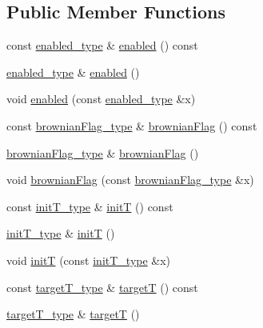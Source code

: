 \subsection*{Public Member Functions}
\begin{DoxyCompactItemize}
\item 
const \hyperlink{classthermo__t_adf9ac04cf37c2de46153e42511aa24c2}{enabled\-\_\-type} \& \hyperlink{classthermo__t_a3aa7ffbdb0417688a62e179a18ba7462}{enabled} () const 
\item 
\hyperlink{classthermo__t_adf9ac04cf37c2de46153e42511aa24c2}{enabled\-\_\-type} \& \hyperlink{classthermo__t_a0217614b0cde90034bd14ae06c4eec98}{enabled} ()
\item 
void \hyperlink{classthermo__t_a8a9c1776001e41905c35ae9350c1b90f}{enabled} (const \hyperlink{classthermo__t_adf9ac04cf37c2de46153e42511aa24c2}{enabled\-\_\-type} \&x)
\item 
const \hyperlink{classthermo__t_a124b0a16394a6c7839596d1a8ba5c35b}{brownian\-Flag\-\_\-type} \& \hyperlink{classthermo__t_a1be9e6c6379a040c6bc2ae7c2a170011}{brownian\-Flag} () const 
\item 
\hyperlink{classthermo__t_a124b0a16394a6c7839596d1a8ba5c35b}{brownian\-Flag\-\_\-type} \& \hyperlink{classthermo__t_a91fe0bc3623154b201d48581c8730a69}{brownian\-Flag} ()
\item 
void \hyperlink{classthermo__t_a08216f2aba58f22fbe616df2f5995ed2}{brownian\-Flag} (const \hyperlink{classthermo__t_a124b0a16394a6c7839596d1a8ba5c35b}{brownian\-Flag\-\_\-type} \&x)
\item 
const \hyperlink{classthermo__t_a29526c32fe31feb33a21833b0040dca7}{init\-T\-\_\-type} \& \hyperlink{classthermo__t_aa9c842008670ae7deb59f3a4505b282c}{init\-T} () const 
\item 
\hyperlink{classthermo__t_a29526c32fe31feb33a21833b0040dca7}{init\-T\-\_\-type} \& \hyperlink{classthermo__t_afab20b99396b34f9c656056df0d78060}{init\-T} ()
\item 
void \hyperlink{classthermo__t_a52188026af78562b9315167142ab22be}{init\-T} (const \hyperlink{classthermo__t_a29526c32fe31feb33a21833b0040dca7}{init\-T\-\_\-type} \&x)
\item 
const \hyperlink{classthermo__t_a87b71140ee6bb1936aeed1d3b79a3596}{target\-T\-\_\-type} \& \hyperlink{classthermo__t_aef84f88d4cac4cb650154f71dad6c415}{target\-T} () const 
\item 
\hyperlink{classthermo__t_a87b71140ee6bb1936aeed1d3b79a3596}{target\-T\-\_\-type} \& \hyperlink{classthermo__t_a7779b75fd22e383b11f17b05b92d98db}{target\-T} ()

\end{DoxyCompactItemize}
